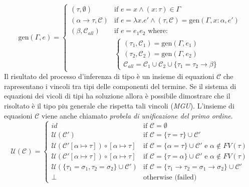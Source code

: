 \begin{equation}
    \text{gen}(\Gamma, e) = 
    \begin{cases} 
        (\tau, \emptyset) & \text{if } e = x \land (x : \tau) \in \Gamma \\
        (\alpha \to \tau, \mathcal{C}) & \text{if } e = \lambda x. e' \land (\tau, \mathcal{C}) = \text{gen}(\Gamma, x : \alpha, e') \\
        (\beta, \mathcal{C}_{all}) & \text{if } e = e_1 e_2 \text{ where:} \\ & 
        \begin{cases} 
            (\tau_1, \mathcal{C}_1) = \text{gen}(\Gamma, e_1) \\
            (\tau_2, \mathcal{C}_2) = \text{gen}(\Gamma, e_2) \\
            \mathcal{C}_{all} = \mathcal{C}_1 \cup \mathcal{C}_2 \cup \{\tau_1 = \tau_2 \to \beta\}
        \end{cases}
    \end{cases}
    \label{eq:constraint_generation}
\end{equation}
Il risultato del processo d'inferenza di tipo è un insieme di equazioni $\mathcal{C}$ che rapresentano i vincoli tra tipi delle componenti del termine.
Se il sistema di equazioni dei vicoli di tipi ha soluzione allora è possibile dimostrare che il risoltato è il tipo piu generale che rispetta tali vincoli 
(\emph{MGU}). L'insieme di equasioni $\mathcal{C}$ viene anche chiamato \emph{probela di unificazione del primo ordine}.
\begin{equation}
    \mathcal{U}(\mathcal{C}) = 
    \begin{cases} 
        id & \text{if } \mathcal{C} = \emptyset \\
        \mathcal{U}(\mathcal{C}') & \text{if } \mathcal{C} = \{\tau = \tau\} \cup \mathcal{C}' \\
        \mathcal{U}(\mathcal{C}'[\alpha \mapsto \tau]) \circ [\alpha \mapsto \tau] & \text{if } \mathcal{C} = \{\alpha = \tau\} \cup \mathcal{C}' \text{ e } \alpha \notin FV(\tau) \\
        \mathcal{U}(\mathcal{C}'[\alpha \mapsto \tau]) \circ [\alpha \mapsto \tau] & \text{if } \mathcal{C} = \{\tau = \alpha\} \cup \mathcal{C}' \text{ e } \alpha \notin FV(\tau) \\
        \mathcal{U}(\{\tau_1 = \sigma_1, \tau_2 = \sigma_2\} \cup \mathcal{C}') & \text{if }    \mathcal{C} = \{\tau_1 \to \tau_2 = \sigma_1 \to \sigma_2\} \cup \mathcal{C}' \\
        \perp & \text{otherwise (failed)}
    \end{cases}
    \label{eq:unification_algorithm}
\end{equation}
